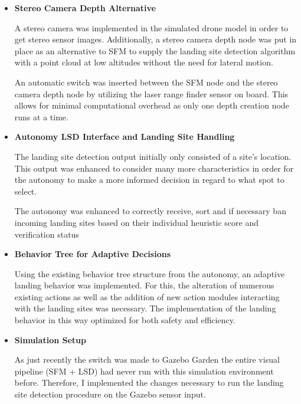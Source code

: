 \begin{itemize}
    \item \textbf{Stereo Camera Depth Alternative}

    A stereo camera was implemented in the simulated drone model in order to get stereo sensor images. Additionally, a stereo camera depth node was put in place as an alternative to SFM to supply the landing site detection algorithm with a point cloud at low altitudes without the need for lateral motion. 

    An automatic switch was inserted between the SFM node and the stereo camera depth node by utilizing the laser range finder sensor on board. This allows for minimal computational overhead as only one depth creation node runs at a time.
    \item \textbf{Autonomy LSD Interface and Landing Site Handling}

    The landing site detection output initially only consisted of a site's location. This output was enhanced to consider many more characteristics in order for the autonomy to make a more informed decision in regard to what spot to select.

    The autonomy was enhanced to correctly receive, sort and if necessary ban incoming landing sites based on their individual heuristic score and verification status
    \item \textbf{Behavior Tree for Adaptive Decisions}

    Using the existing behavior tree structure from the autonomy, an adaptive landing behavior was implemented. For this, the alteration of numerous existing actions as well as the addition of new action modules interacting with the landing sites was necessary. The implementation of the landing behavior in this way optimized for both safety and efficiency.
    \item \textbf{Simulation Setup}

    As just recently the switch was made to Gazebo Garden the entire visual pipeline (SFM + LSD) had never run with this simulation environment before. Therefore, I implemented the changes necessary to run the landing site detection procedure on the Gazebo sensor input. 


\end{itemize}
